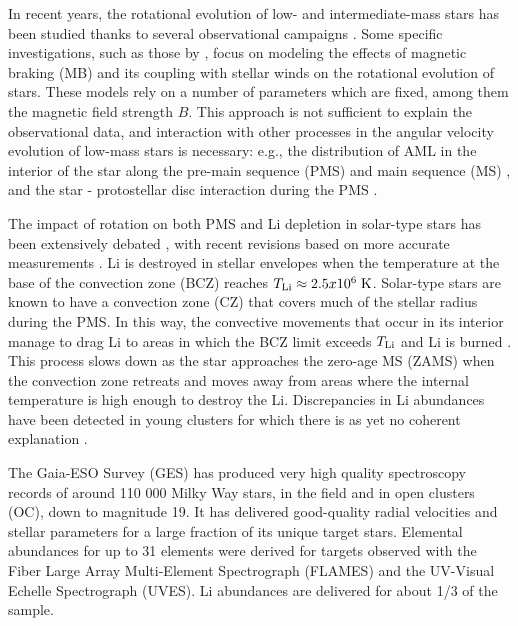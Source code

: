 \documentclass[fleqn,usenatbib]{mnras}
\begin{document}
In recent years, the rotational evolution of low- and intermediate-mass stars has been studied thanks to several observational campaigns \citep{Hartman2010, Gallet2013, Bouvier2016}. Some specific investigations, such as those by \citet{Ud-Doula2008, Cranmer2011, Gallet2015, Amard2016}, focus on modeling the effects of magnetic braking (MB) and its coupling with stellar winds on the rotational evolution of stars. These models rely on a number of parameters which are fixed, among them the magnetic field strength $B$. This approach is not sufficient to explain the observational data, and interaction with other processes in the angular velocity evolution of low-mass stars is necessary: e.g., the distribution of AML in the interior of the star along the pre-main sequence (PMS) and main sequence (MS) \citep{Charbonnel2005, Eggenberger2008, Eggenberger2009, Caballero2020}, and the star - protostellar disc interaction during the PMS \citep{Bouvier2008,Gallet2013,Eggenberger2012,Zanni2012,Bouvier2016}.\par

The impact of rotation on both PMS and Li depletion in solar-type stars has been extensively debated \citep{Pinsonneault1997,Jeffries2004,Somers2014}, with recent revisions based on more accurate measurements \citep{Gallet2013, Bouvier2016, Bouvier2018, Franciosini2022}. Li is destroyed in stellar envelopes when the temperature at the base of the convection zone (BCZ) reaches $T_{\mathrm{Li}} \approx 2.5 x 10^6\; \mathrm{K}$. Solar-type stars are known to have a convection zone (CZ) that covers much of the stellar radius during the PMS. In this way, the convective movements that occur in its interior manage to drag Li to areas in which the BCZ limit exceeds $T_{\mathrm{Li}}$ and Li is burned \citep{Iben1965}. This process slows down as the star approaches the zero-age MS (ZAMS) when the convection zone retreats and moves away from areas where the internal temperature is high enough to destroy the Li. Discrepancies in Li abundances have been detected in young clusters for which there is as yet no coherent explanation \citep[see][and references therein]{Caballero2020}.\par

The Gaia-ESO Survey (GES) \citep{Gilmore2012,Randich2013,Randich2022} has produced very high quality spectroscopy records of around 110 000 Milky Way stars, in the field and in open clusters (OC), down to magnitude 19. It has delivered good-quality radial velocities and stellar parameters for a large fraction of its unique target stars. Elemental abundances for up to 31 elements were derived for targets observed with the Fiber Large Array Multi-Element Spectrograph (FLAMES) and the UV-Visual Echelle Spectrograph (UVES). Li abundances are delivered for about 1/3 of the sample.\par
\end{document}
